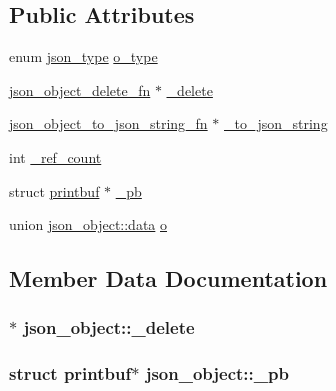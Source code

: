 \subsection*{Public Attributes}
\begin{DoxyCompactItemize}
\item 
enum \hyperlink{json__object_8h_ac75c61993722a9b8aaa44704072ec06c}{json\+\_\+type} \hyperlink{structjson__object_a28307a4a3fe6cefe27e28fec56b76b3e}{o\+\_\+type}
\item 
\hyperlink{json__object__private_8h_ad05370ba58e4fbb6b37a6774a2a9df24}{json\+\_\+object\+\_\+delete\+\_\+fn} $\ast$ \hyperlink{structjson__object_aa3a238f4b671c21fa0578fc37a126c2e}{\+\_\+delete}
\item 
\hyperlink{json__object__private_8h_a43bf45347d99b1257ae108fd1ce286dd}{json\+\_\+object\+\_\+to\+\_\+json\+\_\+string\+\_\+fn} $\ast$ \hyperlink{structjson__object_a077a02daac4653f91584dd7f47c3d632}{\+\_\+to\+\_\+json\+\_\+string}
\item 
int \hyperlink{structjson__object_aca9b93573ba6bb8cf66d87c170a575b2}{\+\_\+ref\+\_\+count}
\item 
struct \hyperlink{structprintbuf}{printbuf} $\ast$ \hyperlink{structjson__object_afdcaa9e24bce7c86c33cb6f6ae65cb56}{\+\_\+pb}
\item 
union \hyperlink{unionjson__object_1_1data}{json\+\_\+object\+::data} \hyperlink{structjson__object_a33aff83ffea02b934235c4821cca8cf0}{o}
\end{DoxyCompactItemize}


\subsection{Member Data Documentation}
\subsubsection[{\texorpdfstring{\+\_\+delete}{_delete}}]{$\ast$ json\+\_\+object\+::\+\_\+delete}\hypertarget{structjson__object_aa3a238f4b671c21fa0578fc37a126c2e}{}\label{structjson__object_aa3a238f4b671c21fa0578fc37a126c2e}
\subsubsection[{\texorpdfstring{\+\_\+pb}{_pb}}]{\setlength{\rightskip}{0pt plus 5cm}struct {\bf printbuf}$\ast$ json\+\_\+object\+::\+\_\+pb}\hypertarget{structjson__object_afdcaa9e24bce7c86c33cb6f6ae65cb56}{}\label{structjson__object_afdcaa9e24bce7c86c33cb6f6ae65cb56}
